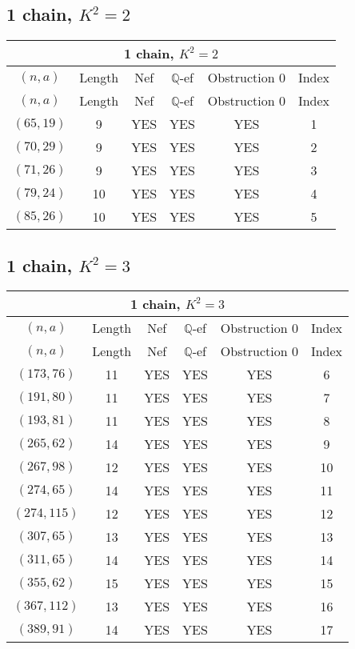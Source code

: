 \subsection{1 chain, $K^2 = 2$}
\begin{longtable}{|c|c|c|c|c|c|}
\hline
\multicolumn{6}{|c|}{1 chain, $K^2 = 2$}\\
\hline
$(n,a)$ & Length & Nef & $\mathbb Q$-ef & Obstruction 0 & Index\\
\hline
\endfirsthead

\hline
$(n,a)$ & Length & Nef & $\mathbb Q$-ef & Obstruction 0 & Index\\
\hline
\endhead
\hline
\endfoot

$(65, 19)$ & 9 & YES & YES & YES & 1\\
$(70, 29)$ & 9 & YES & YES & YES & 2\\
$(71, 26)$ & 9 & YES & YES & YES & 3\\
$(79, 24)$ & 10 & YES & YES & YES & 4\\
$(85, 26)$ & 10 & YES & YES & YES & 5
\end{longtable}
\subsection{1 chain, $K^2 = 3$}
\begin{longtable}{|c|c|c|c|c|c|}
\hline
\multicolumn{6}{|c|}{1 chain, $K^2 = 3$}\\
\hline
$(n,a)$ & Length & Nef & $\mathbb Q$-ef & Obstruction 0 & Index\\
\hline
\endfirsthead

\hline
$(n,a)$ & Length & Nef & $\mathbb Q$-ef & Obstruction 0 & Index\\
\hline
\endhead
\hline
\endfoot

$(173, 76)$ & 11 & YES & YES & YES & 6\\
$(191, 80)$ & 11 & YES & YES & YES & 7\\
$(193, 81)$ & 11 & YES & YES & YES & 8\\
$(265, 62)$ & 14 & YES & YES & YES & 9\\
$(267, 98)$ & 12 & YES & YES & YES & 10\\
$(274, 65)$ & 14 & YES & YES & YES & 11\\
$(274, 115)$ & 12 & YES & YES & YES & 12\\
$(307, 65)$ & 13 & YES & YES & YES & 13\\
$(311, 65)$ & 14 & YES & YES & YES & 14\\
$(355, 62)$ & 15 & YES & YES & YES & 15\\
$(367, 112)$ & 13 & YES & YES & YES & 16\\
$(389, 91)$ & 14 & YES & YES & YES & 17
\end{longtable}
